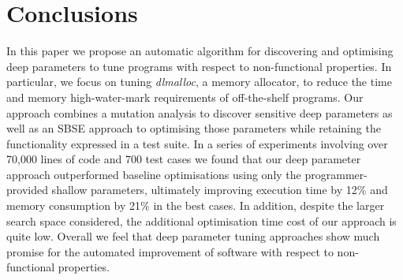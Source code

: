 \section{Conclusions}

In this paper we propose an automatic algorithm for discovering and
optimising deep parameters to tune programs with respect to non-functional
properties.  In particular, we focus on tuning \emph{dlmalloc}, a memory
allocator, to reduce the time and memory high-water-mark requirements of
off-the-shelf programs. Our approach combines a mutation analysis to
discover sensitive deep parameters as well as an SBSE approach to
optimising those parameters while retaining the functionality expressed in
a test suite.  In a series of experiments involving over 70,000 lines of
code and 700 test cases we found that our deep parameter approach
outperformed baseline optimisations using only the programmer-provided
shallow parameters, ultimately improving execution time by 12\% 
and memory consumption by 21\% in the best cases. In addition, despite
the larger search space considered, the additional optimisation time cost
of our approach is quite low. Overall we feel that deep parameter tuning 
approaches show much promise for the automated improvement of software
with respect to non-functional properties.  



